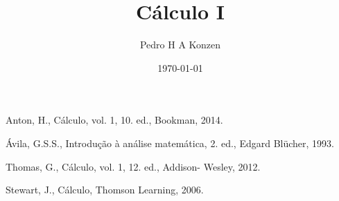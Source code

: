 \documentclass[12pt]{book}
\begin{document}
\frontmatter

\title{Cálculo I}
\author{Pedro H A Konzen}
\date{\today}
\ifishtml
\else
{}
\fi

\maketitle





\tableofcontents
{}

\mainmatter

%
%






\ifisbook

\fi

%
\begin{thebibliography}{99}
  Anton, H., Cálculo, vol. 1, 10. ed., Bookman, 2014.
  
  Ávila, G.S.S., Introdução à análise matemática, 2. ed., Edgard Blücher, 1993.

  Thomas, G., Cálculo, vol. 1, 12. ed., Addison- Wesley, 2012.

  Stewart, J., Cálculo, Thomson Learning, 2006.
\end{thebibliography}
\end{document}
